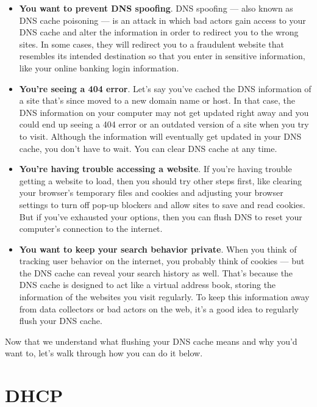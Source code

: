 \documentclass[a4paper,12pt]{book}
\begin{document}
\begin{itemize}
\item{\textbf{You want to prevent DNS spoofing}.
DNS spoofing — also known as DNS cache poisoning — is an attack in which bad actors gain access to your DNS cache and alter the information in order to redirect you to the wrong sites. In some cases, they will redirect you to a fraudulent website that resembles its intended destination so that you enter in sensitive information, like your online banking login information.}

\item{\textbf{You’re seeing a 404 error}.
Let’s say you’ve cached the DNS information of a site that’s since moved to a new domain name or host. In that case, the DNS information on your computer may not get updated right away and you could end up seeing a 404 error or an outdated version of a site when you try to visit. Although the information will eventually get updated in your DNS cache, you don’t have to wait. You can clear DNS cache at any time.}

\item{\textbf{You’re having trouble accessing a website}.
If you’re having trouble getting a website to load, then you should try other steps first, like clearing your browser's temporary files and cookies and adjusting your browser settings to turn off pop-up blockers and allow sites to save and read cookies. But if you’ve exhausted your options, then you can flush DNS to reset your computer's connection to the internet.}

\item{\textbf{You want to keep your search behavior private}.
When you think of tracking user behavior on the internet, you probably think of cookies — but the DNS cache can reveal your search history as well. That’s because the DNS cache is designed to act like a virtual address book, storing the information of the websites you visit regularly. To keep this information away from data collectors or bad actors on the web, it’s a good idea to regularly flush your DNS cache.}
\end{itemize}
Now that we understand what flushing your DNS cache means and why you’d want to, let’s walk through how you can do it below.



\section{DHCP}
\end{document}
